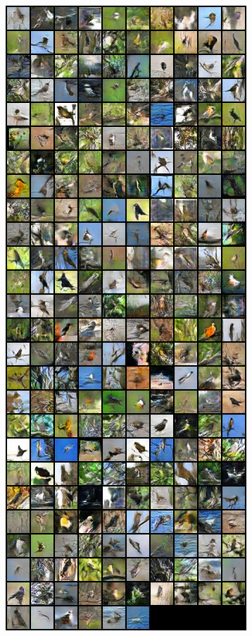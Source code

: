 \documentclass[11pt,addpoints,answers]{exam}
\numberwithin{equation}{section} %
\numberwithin{figure}{section} %
\numberwithin{table}{section} %
\begin{document}
\begin{questions}
\begin{figure}[H]
    \begin{subfigure}[b]{0.32\linewidth}
        \includegraphics[width=\linewidth]{1.5_samples.png}

\end{subfigure}
\end{figure}
\end{questions}
\end{document}
